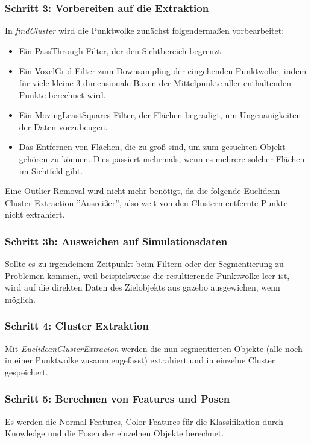 \documentclass{suturo}
\begin{document}
\subsubsection{Schritt 3: Vorbereiten auf die Extraktion} 
In \textit{findCluster} wird die Punktwolke zunächst folgendermaßen vorbearbeitet:

\begin{itemize} 
\item Ein PassThrough Filter, der den Sichtbereich begrenzt.
\item Ein VoxelGrid Filter zum Downsampling der eingehenden Punktwolke, indem für viele kleine 3-dimensionale Boxen der Mittelpunkte aller enthaltenden Punkte berechnet wird.
\item Ein MovingLeastSquares Filter, der Flächen begradigt, um Ungenauigkeiten der Daten vorzubeugen.
\item Das Entfernen von Flächen, die zu groß sind, um zum gesuchten Objekt gehören zu können. Dies passiert mehrmals, wenn es mehrere solcher Flächen im Sichtfeld gibt.
\end{itemize}
Eine Outlier-Removal wird nicht mehr benötigt, da die folgende Euclidean Cluster Extraction ''Ausreißer'', also weit von den Clustern entfernte Punkte nicht extrahiert.\\
\subsubsection{Schritt 3b: Ausweichen auf Simulationsdaten}
Sollte es zu irgendeinem Zeitpunkt beim Filtern oder der Segmentierung zu Problemen kommen, weil beispielsweise die resultierende Punktwolke leer ist, wird auf die direkten Daten des Zielobjekts aus gazebo ausgewichen, wenn möglich.
\\
\subsubsection{Schritt 4: Cluster Extraktion}
Mit \textit{EuclideanClusterExtracion} werden die nun segmentierten Objekte (alle noch in einer Punktwolke zusammengefasst) extrahiert und in einzelne Cluster gespeichert.
\\
\subsubsection{Schritt 5: Berechnen von Features und Posen}
Es werden die Normal-Features, Color-Features für die Klassifikation durch Knowledge und die Posen der einzelnen Objekte berechnet.
 
\end{document}
